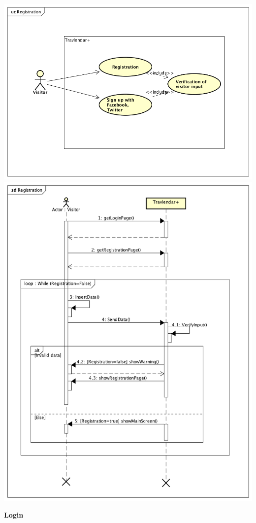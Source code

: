 \documentclass[12pt,titlepage]{article}
\begin{document}
\includegraphics[scale=0.65]{"UseCase Registration"} 
\includegraphics[scale=0.64]{"SequenceDiagram Registration"} 

\begin{flushleft}
\textbf{Login} 
\end{flushleft}
\end{document}
